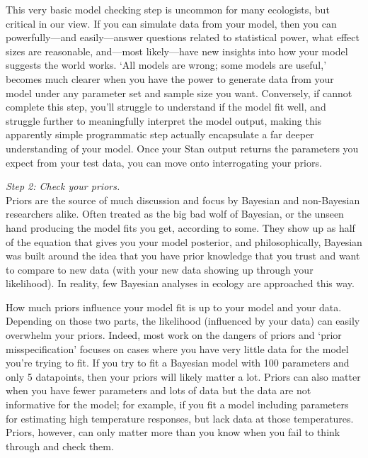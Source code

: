 \documentclass[11pt]{article}
\begin{document}
{This very basic model checking step is uncommon for many ecologists, but critical in our view. If you can simulate data from your model, then you can powerfully---and easily---answer questions related to statistical power, what effect sizes are reasonable, and---most likely---have new insights into how your model suggests the world works. `All models are wrong; some models are useful,' becomes much clearer when you have the power to generate data from your model under any parameter set and sample size you want. Conversely, if cannot complete this step, you'll struggle to understand if the model fit well, and struggle further to meaningfully interpret the model output, making this apparently simple programmatic step actually encapsulate a far deeper understanding of your model. Once your \textsf{Stan} output returns the parameters you expect from your test data, you can move onto interrogating your priors. 

\emph{Step 2: Check your priors.} \\
Priors are the source of much discussion and focus by Bayesian and non-Bayesian researchers alike. Often treated as the big bad wolf of Bayesian, or the unseen hand producing the model fits you get, according to some. They show up as half of the equation that gives you your model posterior, and philosophically, Bayesian was built around the idea that you have prior knowledge that you trust and want to compare to new data (with your new data showing up through your likelihood). In reality, few Bayesian analyses in ecology are approached this way. 

How much priors influence your model fit is up to your model and your data. Depending on those two parts, the likelihood (influenced by your data) can easily overwhelm your priors. Indeed, most work on the dangers of priors and `prior misspecification'  focuses on cases where you have very little data for the model you're trying to fit. If you try to fit a Bayesian model with 100 parameters and only 5 datapoints, then your priors will likely matter a lot. Priors can also matter when you have fewer parameters and lots of data but the data are not informative for the model; for example, if you fit a model including parameters for estimating high temperature responses, but lack data at those temperatures. Priors, however, can only matter more than you know when you fail to think through and check them. 

}
\end{document}
